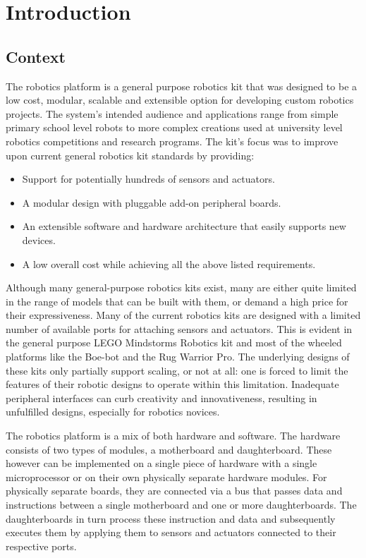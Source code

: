 \chapter{Introduction} 


\section{Context}
The \xten robotics platform is a general purpose robotics kit that was designed to be a low cost, modular, scalable and extensible option for developing custom robotics projects. The system's intended audience and applications range from simple primary school level robots to more complex creations used at university level robotics competitions and research programs. The \xten kit's focus was to improve upon current general robotics kit standards by providing:
\begin{itemize}
\item Support for potentially hundreds of sensors and actuators.
\item A modular design with pluggable add-on peripheral boards.
\item An extensible software and hardware architecture that easily supports new devices.
\item A low overall cost while achieving all the above listed requirements.
\end{itemize}

Although many general-purpose robotics kits exist, many are either quite limited in the range of models that can be built with them, or demand a high price for their expressiveness. Many of the current robotics kits are designed with a limited number of available ports for attaching sensors and actuators. This is evident in the general purpose LEGO Mindstorms Robotics kit and most of the wheeled platforms like the Boe-bot and the Rug Warrior Pro. %
The underlying designs of these kits only partially support scaling, or not at all: one is forced to limit the features of their robotic designs to operate within this limitation. Inadequate peripheral interfaces can curb creativity and innovativeness, resulting in unfulfilled designs, especially for robotics novices.

The \xten robotics platform is a mix of both hardware and software. The hardware consists of two types of modules, a motherboard and daughterboard. These however can be implemented on a single piece of hardware with a single microprocessor or on their own physically separate hardware modules. For physically separate boards, they are connected via a bus that passes data and instructions between a single motherboard and one or more daughterboards. The daughterboards in turn process these instruction and data and subsequently executes them by applying them to sensors and actuators connected to their respective ports.


